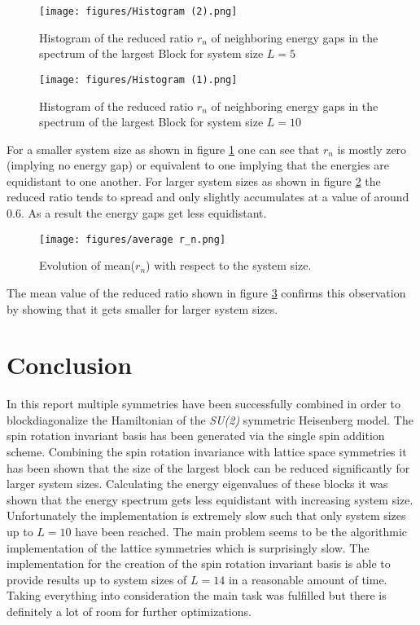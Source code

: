 \documentclass{scrartcl}
\begin{document}
\begin{figure}[htbp]
    \centering
    \texttt{[image: figures/Histogram (2).png]}
    \caption{Histogram of the reduced ratio $r_n$ of neighboring energy gaps in the spectrum of the largest Block for system size $L=5$}
    \label{fig:histo_5}
\end{figure}
\FloatBarrier

\begin{figure}[htbp]
    \centering
    \texttt{[image: figures/Histogram (1).png]}
    \caption{Histogram of the reduced ratio $r_n$ of neighboring energy gaps in the spectrum of the largest Block for system size $L=10$}
    \label{fig:histo_10}
\end{figure}
\FloatBarrier
For a smaller system size as shown in figure \ref{fig:histo_5} one can see that $r_n$ is mostly zero (implying no energy gap) or equivalent to one implying that the energies are equidistant to one another.
For larger system sizes as shown in figure \ref{fig:histo_10} the reduced ratio tends to spread and only slightly accumulates at a value of around $0.6$. As a result the energy gaps get less equidistant.

\begin{figure}[htbp]
    \centering
    \texttt{[image: figures/average r\_n.png]}
    \caption{Evolution of mean($r_n$) with respect to the system size.}
    \label{fig:average r_n}
\end{figure}

The mean value of the reduced ratio shown in figure \ref{fig:average r_n} confirms this observation by showing that it gets smaller for larger system sizes. 

\section{Conclusion}
In this report multiple symmetries have been successfully combined in order to blockdiagonalize the Hamiltonian of the \textit{SU(2)} symmetric Heisenberg model. The spin rotation invariant basis has been generated via the single spin addition scheme. Combining the spin rotation invariance with lattice space symmetries it has been shown that the size of the largest block can be reduced significantly for larger system sizes. Calculating the energy eigenvalues of these blocks it was shown that the energy spectrum gets less equidistant with increasing system size.\\
Unfortunately the implementation is extremely slow such that only system sizes up to $L=10$ have been reached. The main problem seems to be the algorithmic implementation of the lattice symmetries which is surprisingly slow. The implementation for the creation of the spin rotation invariant basis is able to provide results up to system sizes of $L=14$ in a reasonable amount of time. Taking everything into consideration the main task was fulfilled but there is definitely a lot of room for further optimizations.
\end{document}
